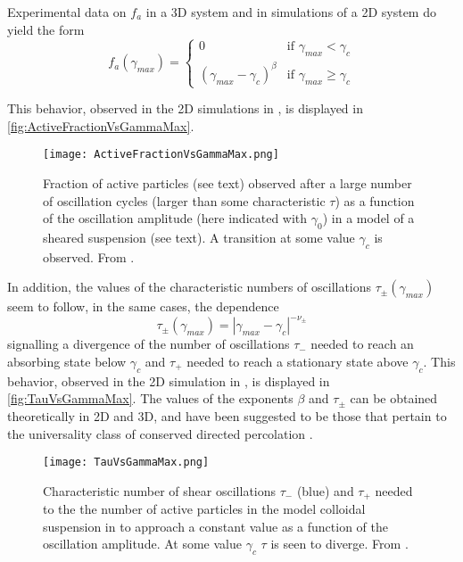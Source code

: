 Experimental data on $f_{a}$ in a 3D system and in simulations of a 2D system \cite{corte2008random} do yield the form
\begin{equation}
	f_{a}(\gamma_{max}) = 
	\left\{ 
	\begin{array}{rl}
		0 & \text{if } \gamma_{max} < \gamma_{c}  \\
		(\gamma_{max} - \gamma_{c})^{\beta} & \text{if } \gamma_{max} \geq \gamma_{c}
	\end{array}
	\right.
	\label{eq:ActiveFractionVsGammaMax}
\end{equation}

This behavior, observed in the 2D simulations in \cite{corte2008random}, is displayed in \autoref{fig:ActiveFractionVsGammaMax}.

\begin{figure} 
\centering 
\texttt{[image: ActiveFractionVsGammaMax.png]} 
\caption{Fraction of active particles (see text) observed after a large number of oscillation cycles (larger than some characteristic $\tau$) as a function of the oscillation amplitude (here indicated with $\gamma_{0}$) in a model of a sheared suspension (see text). A transition at some value $\gamma_{c}$ is observed. From \cite{corte2008random}. \label{fig:ActiveFractionVsGammaMax}}
\end{figure}

In addition, the values of the characteristic numbers of oscillations $\tau_{\pm}(\gamma_{max})$ seem to follow, in the same cases, the dependence
\begin{equation}
	\tau_{\pm}(\gamma_{max}) = |\gamma_{max} - \gamma_{c}|^{-\nu_{\pm}}
	\label{eq:TauVsGammaMax}
\end{equation}
signalling a divergence of the number of oscillations $\tau_{-}$ needed to reach an absorbing state below $\gamma_{c}$ and $\tau_{+}$ needed to reach a stationary state above $\gamma_{c}$.
This behavior, observed in the 2D simulation in \cite{corte2008random}, is displayed in \autoref{fig:TauVsGammaMax}.
The values of the exponents $\beta$ and $\tau_{\pm}$ can be obtained theoretically \cite{menon2009universality} in 2D and 3D, and have been suggested to be those that pertain to the universality class of conserved directed percolation \cite{hinrichsen2000nonequilibrium}.

\begin{figure} 
\centering 
\texttt{[image: TauVsGammaMax.png]} 
\caption{Characteristic number of shear oscillations $\tau_{-}$ (blue) and $\tau_{+}$ needed to the the number of active particles in the model colloidal suspension in \cite{corte2008random} to approach a constant value as a function of the oscillation amplitude. At some value $\gamma_{c}$ $\tau$ is seen to diverge. From \cite{corte2008random}. \label{fig:TauVsGammaMax}}
\end{figure}

